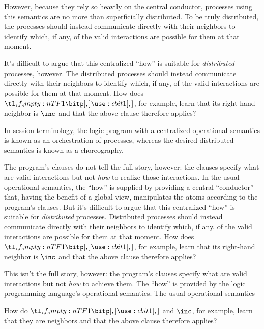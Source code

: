However, because they rely so heavily on the central conductor, processes using this semantics are no more than superficially distributed.
To be truly distributed, the processes should instead communicate directly with their neighbors to identify which, if any, of the valid interactions are possible for them at that moment.

It's difficult to argue that this centralized \enquote{how} is suitable for \emph{distributed} processes, however.
The distributed processes should instead communicate directly with their neighbors to identify which, if any, of the valid interactions are possible for them at that moment.
How does $\bit{1}$, for example, learn that its right-hand neighbor is $\inc$ and that the above clause therefore applies?

In session terminology, the logic program with a centralized operational semantics is known as an orchestration of processes, whereas the desired distributed semantics is known as a choreography.




The program's clauses do not tell the full story, however: the clauses specify what are valid interactions but not \emph{how} to realize those interactions.
In the usual operational semantics, the \enquote{how} is supplied by providing a central \enquote{conductor} that, having the benefit of a global view, manipulates the atoms according to the program's clauses.
But it's difficult to argue that this centralized \enquote{how} is suitable for \emph{distributed} processes.
Distributed processes should instead communicate directly with their neighbors to identify which, if any, of the valid interactions are possible for them at that moment.
How does $\bit{1}$, for example, learn that its right-hand neighbor is $\inc$ and that the above clause therefore applies?






This isn't the full story, however:
the program's clauses specify what are valid interactions but not \emph{how} to achieve them.
The \enquote{how} is provided by the logic programming language's operational semantics.
The usual operational semantics


How do $\bit{1}$ and $\inc$, for example, learn that they are neighbors and that the above clause therefore applies?


